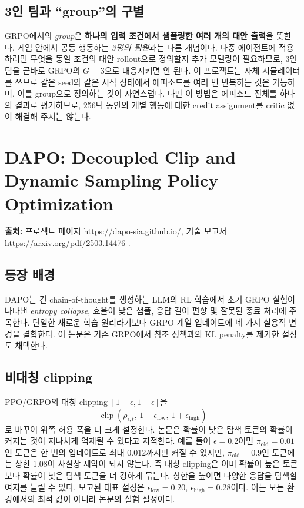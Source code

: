 \documentclass[11pt,a4paper]{article}
\newcommand{\clip}{\operatorname{clip}}
\begin{document}
\subsection{3인 팀과 ``group''의 구별}
GRPO에서의 \emph{group}은 \textbf{하나의 입력 조건에서 샘플링한 여러 개의 대안 출력}을 뜻한다. 게임 안에서 공동 행동하는 \emph{3명의 팀원}과는 다른 개념이다. 다중 에이전트에 적용하려면 무엇을 동일 조건의 대안 rollout으로 정의할지 추가 모델링이 필요하므로, 3인 팀을 곧바로 GRPO의 \(G=3\)으로 대응시키면 안 된다. 이 프로젝트는 자체 시뮬레이터를 쓰므로 같은 seed와 같은 시작 상태에서 에피소드를 여러 번 반복하는 것은 가능하며, 이를 group으로 정의하는 것이 자연스럽다. 다만 이 방법은 에피소드 전체를 하나의 결과로 평가하므로, 256틱 동안의 개별 행동에 대한 credit assignment를 critic 없이 해결해 주지는 않는다.

\section{DAPO: Decoupled Clip and Dynamic Sampling Policy Optimization}\label{sec:dapo}
\noindent\textbf{출처:} 프로젝트 페이지 \url{https://dapo-sia.github.io/}, 기술 보고서 \url{https://arxiv.org/pdf/2503.14476} \cite{dapo}.

\subsection{등장 배경}
DAPO는 긴 chain-of-thought를 생성하는 LLM의 RL 학습에서 초기 GRPO 실험이 나타낸 \emph{entropy collapse}, 효율이 낮은 샘플, 응답 길이 편향 및 잘못된 종료 처리에 주목한다. 단일한 새로운 학습 원리라기보다 GRPO 계열 업데이트에 네 가지 실용적 변경을 결합한다. 이 논문은 기존 GRPO에서 참조 정책과의 KL penalty를 제거한 설정도 채택한다.

\subsection{비대칭 clipping}
PPO/GRPO의 대칭 clipping \([1-\epsilon,1+\epsilon]\)을
\begin{equation}
 \clip(\rho_{i,t},\,1-\epsilon_{\mathrm{low}},\,1+\epsilon_{\mathrm{high}})
\end{equation}
로 바꾸어 위쪽 허용 폭을 더 크게 설정한다. 논문은 확률이 낮은 탐색 토큰의 확률이 커지는 것이 지나치게 억제될 수 있다고 지적한다. 예를 들어 \(\epsilon=0.2\)이면 \(\pi_{\mathrm{old}}=0.01\)인 토큰은 한 번의 업데이트로 최대 0.012까지만 커질 수 있지만, \(\pi_{\mathrm{old}}=0.9\)인 토큰에는 상한 1.08이 사실상 제약이 되지 않는다. 즉 대칭 clipping은 이미 확률이 높은 토큰보다 확률이 낮은 탐색 토큰을 더 강하게 묶는다. 상한을 높이면 다양한 응답을 탐색할 여지를 늘릴 수 있다. 보고된 대표 설정은 \(\epsilon_{\mathrm{low}}=0.20\), \(\epsilon_{\mathrm{high}}=0.28\)이다. 이는 모든 환경에서의 최적 값이 아니라 논문의 실험 설정이다.
\end{document}

